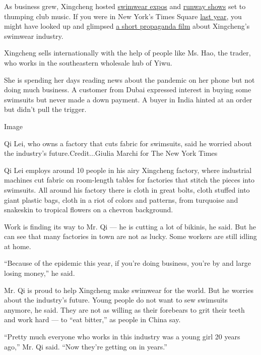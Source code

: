 As business grew, Xingcheng hosted
\href{http://www.zxzxnews.com/Fashion/2019/0903/17326.html}{swimwear
expos} and \href{https://v.qq.com/x/page/z07650idifb.html}{runway shows}
set to thumping club music. If you were in New York's Times Square
\href{https://www.prnewswire.com/news-releases/a-video-clip-telling-about-chinese-swimsuit-shines-at-nyc-times-square-300902370.html}{last
year}, you might have looked up and glimpsed
\href{https://mp.weixin.qq.com/s/B2nlOwy3hv9slQAfvI9rYA}{a short
propaganda film} about Xingcheng's swimwear industry.

Xingcheng sells internationally with the help of people like Ms. Hao,
the trader, who works in the southeastern wholesale hub of Yiwu.

She is spending her days reading news about the pandemic on her phone
but not doing much business. A customer from Dubai expressed interest in
buying some swimsuits but never made a down payment. A buyer in India
hinted at an order but didn't pull the trigger.

Image

Qi Lei, who owns a factory that cuts fabric for swimsuits, said he
worried about the industry's future.Credit...Giulia Marchi for The New
York Times

Qi Lei employs around 10 people in his airy Xingcheng factory, where
industrial machines cut fabric on room-length tables for factories that
stitch the pieces into swimsuits. All around his factory there is cloth
in great bolts, cloth stuffed into giant plastic bags, cloth in a riot
of colors and patterns, from turquoise and snakeskin to tropical flowers
on a chevron background.

Work is finding its way to Mr. Qi --- he is cutting a lot of bikinis, he
said. But he can see that many factories in town are not as lucky. Some
workers are still idling at home.

``Because of the epidemic this year, if you're doing business, you're by
and large losing money,'' he said.

Mr. Qi is proud to help Xingcheng make swimwear for the world. But he
worries about the industry's future. Young people do not want to sew
swimsuits anymore, he said. They are not as willing as their forebears
to grit their teeth and work hard --- to ``eat bitter,'' as people in
China say.

``Pretty much everyone who works in this industry was a young girl 20
years ago,'' Mr. Qi said. ``Now they're getting on in years.''

